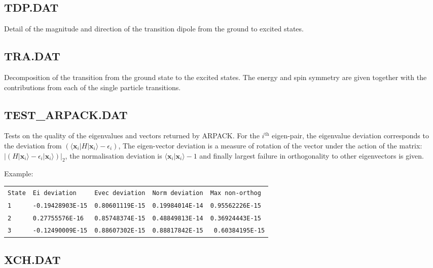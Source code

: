 \subsection{TDP.DAT}

Detail of the magnitude and direction of the transition dipole from the ground
to excited states.

\subsection{TRA.DAT}

Decomposition of the transition from the ground state to the excited states. The
energy and spin symmetry are given together with the contributions from each of
the single particle transitions.

\subsection{TEST\_ARPACK.DAT}

Tests on the quality of the eigenvalues and vectors returned by ARPACK. For the
$i^\mathrm{th}$ eigen-pair, the eigenvalue deviation corresponds to the
deviation from $\left( \langle \mathbf{x}_i | H | \mathbf{x}_i\rangle -
\epsilon_i \right)$, The eigen-vector deviation is a measure of rotation of the
vector under the action of the matrix: $\left| \left( H | \mathbf{x}_i\rangle -
\epsilon_i | \mathbf{x}_i\rangle \right) \right|_2$, the normalisation deviation
is $\langle \mathbf{x}_i | \mathbf{x}_i\rangle - 1$ and finally largest failure
in orthogonality to other eigenvectors is given.

Example:\\
\begin{tabular}{lllll}
{\tt State} & {\tt Ei deviation} & {\tt Evec deviation} & {\tt Norm deviation} &
{\tt Max non-orthog}\\ {\tt 1} & {\tt -0.19428903E-15} & {\tt 0.80601119E-15} &
{\tt 0.19984014E-14} & {\tt 0.95562226E-15}\\ {\tt 2} & {\tt 0.27755576E-16} &
{\tt 0.85748374E-15} & {\tt 0.48849813E-14} & {\tt 0.36924443E-15}\\ {\tt 3} &
{\tt -0.12490009E-15} & {\tt 0.88607302E-15} & {\tt 0.88817842E-15} & {\tt
  0.60384195E-15}\\
\end{tabular}

\subsection{XCH.DAT}

